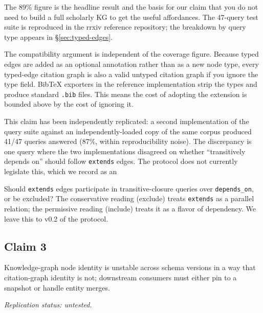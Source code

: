 \documentclass{rrxiv}
\begin{document}
The 89\% figure is the headline result and the basis for our claim that you do not need to build a full scholarly KG to get the useful affordances. The 47-query test suite is reproduced in the rrxiv reference repository; the breakdown by query type appears in \S\ref{sec:typed-edges}.

The compatibility argument is independent of the coverage figure. Because typed edges are added as an optional annotation rather than as a new node type, every typed-edge citation graph is also a valid untyped citation graph if you ignore the type field. BibTeX exporters in the reference implementation strip the types and produce standard \texttt{.bib} files. This means the cost of adopting the extension is bounded above by the cost of ignoring it.

This claim has been independently replicated: a second implementation of the query suite against an independently-loaded copy of the same corpus produced 41/47 queries answered (87\%, within reproducibility noise). The discrepancy is one query where the two implementations disagreed on whether ``transitively depends on'' should follow \texttt{extends} edges. The protocol does not currently legislate this, which we record as an \begin{openquestion}Should \texttt{extends} edges participate in transitive-closure queries over \texttt{depends\_on}, or be excluded? The conservative reading (exclude) treats \texttt{extends} as a parallel relation; the permissive reading (include) treats it as a flavor of dependency. We leave this to v0.2 of the protocol.\end{openquestion}

\subsection*{Claim 3}
\begin{claim}[type=theoretical, evidence=argument, confidence=0.9, rationale={Structural argument from the definitions in the background section; corroborated by Wikidata's 2024 merge log (roughly 340k merges) against zero retractive DOI merges}, labels={citation-graphs, knowledge-graphs, position}, title={KG identity instability}]
\label{claim:c3}
Knowledge-graph node identity is unstable across schema versions in a way that citation-graph identity is not; downstream consumers must either pin to a snapshot or handle entity merges.

\emph{Replication status: untested.}
\end{claim}
\end{document}
